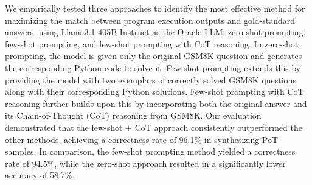 %
We empirically tested three approaches to identify the most effective method for maximizing the match between program execution outputs and gold-standard answers, using Llama3.1 405B Instruct \cite{Llama3} as the Oracle LLM: zero-shot prompting, few-shot prompting, and few-shot prompting with CoT reasoning.
%
In zero-shot prompting, the model is given only the original GSM8K question and generates the corresponding Python code to solve it.
%
Few-shot prompting extends this by providing the model with two exemplars of correctly solved GSM8K questions along with their corresponding Python solutions. 
%
Few-shot prompting with CoT reasoning further builds upon this by incorporating both the original answer and its Chain-of-Thought (CoT) reasoning from GSM8K.
%
Our evaluation demonstrated that the few-shot + CoT approach consistently outperformed the other methods, achieving a correctness rate of 96.1\% in synthesizing PoT samples. In comparison, the few-shot prompting method yielded a correctness rate of 94.5\%, while the zero-shot approach resulted in a significantly lower accuracy of 58.7\%.
% 









  
